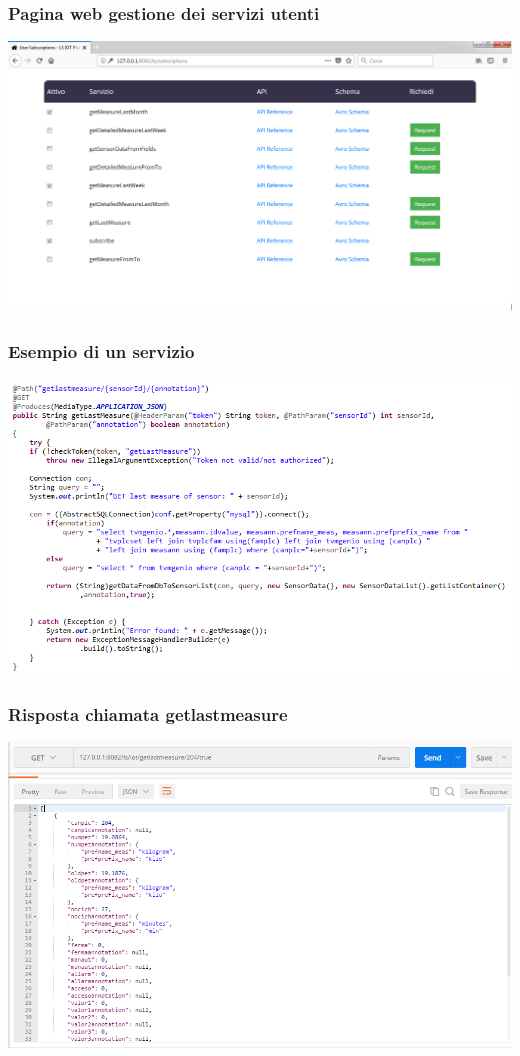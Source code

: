 \documentclass{beamer}
\begin{document}
\begin{frame}
\frametitle{Pagina web gestione dei servizi utenti}
\includegraphics[width=1\textwidth]{images/UserSubscriptionsPlatform.png}
\end{frame}

\begin{frame}
\frametitle{Esempio di un servizio}
\includegraphics[width=1\textwidth]{images/getlastmeasure.png}
\end{frame}

\begin{frame}
\frametitle{Risposta chiamata getlastmeasure}
\includegraphics[width=1\textwidth]{images/Postman1.png}
\end{frame}
\end{document}
